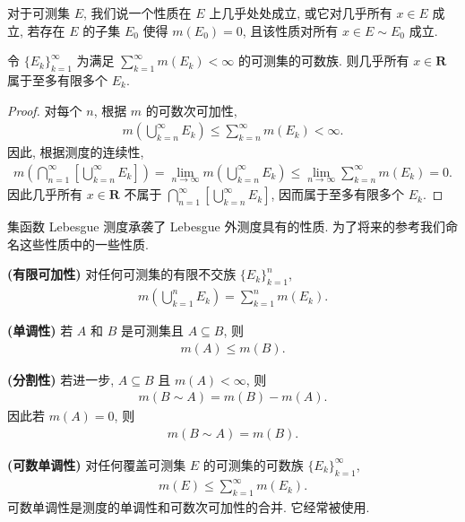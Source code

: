 \documentclass[../../main.tex]{subfiles}
\begin{document}
对于可测集 $E$, 我们说一个性质在 $E$ 上几乎处处成立, 或它对几乎所有 $x\in E$ 成立, 若存在 $E$ 的子集 $E_{0}$ 使得 $m(E_{0})=0$, 且该性质对所有 $x\in E\sim E_{0}$ 成立.

\begin{theorem}\label{theorem:ch02-BorelCantelli}
令 $\{E_{k}\}_{k=1}^{\infty}$ 为满足 $\sum_{k=1}^{\infty}m(E_{k})<\infty$ 的可测集的可数族. 则几乎所有 $x\in\mathbf{R}$ 属于至多有限多个 $E_{k}$.
\end{theorem}

\begin{proof}
对每个 $n$, 根据 $m$ 的可数次可加性,
\begin{align*}
m\left(\bigcup_{k=n}^{\infty}E_{k}\right)\leqslant\sum_{k=n}^{\infty}m(E_{k})<\infty.
\end{align*}
因此, 根据测度的连续性,
\begin{align*}
m\left(\bigcap_{n=1}^{\infty}\left[\bigcup_{k=n}^{\infty}E_{k}\right]\right)=\lim_{n\to\infty}m\left(\bigcup_{k=n}^{\infty}E_{k}\right)\leqslant\lim_{n\to\infty}\sum_{k=n}^{\infty}m(E_{k})=0.
\end{align*}
因此几乎所有 $x\in\mathbf{R}$ 不属于 $\bigcap_{n=1}^{\infty}\left[\bigcup_{k=n}^{\infty}E_{k}\right]$, 因而属于至多有限多个 $E_{k}$.
\end{proof}

集函数 Lebesgue 测度承袭了 Lebesgue 外测度具有的性质. 为了将来的参考我们命名这些性质中的一些性质.

\textbf{(有限可加性)} 对任何可测集的有限不交族 $\{E_{k}\}_{k=1}^{n}$,
\begin{align*}
m\left(\bigcup_{k=1}^{n}E_{k}\right)=\sum_{k=1}^{n}m(E_{k}).
\end{align*}

\textbf{(单调性)} 若 $A$ 和 $B$ 是可测集且 $A\subseteq B$, 则
\begin{align*}
m(A)\leqslant m(B).
\end{align*}

\textbf{(分割性)} 若进一步, $A\subseteq B$ 且 $m(A)<\infty$, 则
\begin{align*}
m(B\sim A)=m(B)-m(A).
\end{align*}
因此若 $m(A)=0$, 则
\begin{align*}
m(B\sim A)=m(B).
\end{align*}

\textbf{(可数单调性)} 对任何覆盖可测集 $E$ 的可测集的可数族 $\{E_{k}\}_{k=1}^{\infty}$,
\begin{align*}
m(E)\leqslant\sum_{k=1}^{\infty}m(E_{k}).
\end{align*}
可数单调性是测度的单调性和可数次可加性的合并. 它经常被使用.
\end{document}
